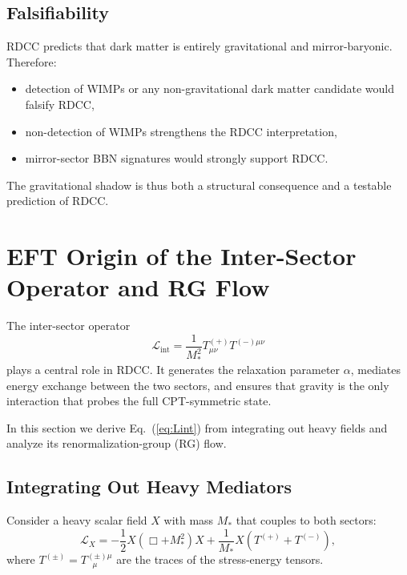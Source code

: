 \documentclass[11pt,a4paper]{article}
\begin{document}
\subsection{Falsifiability}

RDCC predicts that dark matter is entirely gravitational and mirror-baryonic. Therefore:

\begin{itemize}
\item detection of WIMPs or any non-gravitational dark matter candidate would falsify RDCC,
\item non-detection of WIMPs strengthens the RDCC interpretation,
\item mirror-sector BBN signatures would strongly support RDCC.
\end{itemize}

The gravitational shadow is thus both a structural consequence and a testable prediction of RDCC.
\section{EFT Origin of the Inter-Sector Operator and RG Flow}

The inter-sector operator
\begin{equation}
\mathcal{L}_{\mathrm{int}} = \frac{1}{M_*^2} T^{(+)}_{\mu\nu} T^{(-)\mu\nu}
\label{eq:Lint}
\end{equation}
plays a central role in RDCC. It generates the relaxation parameter $\alpha$, mediates energy exchange between the two sectors, and ensures that gravity is the only interaction that probes the full CPT-symmetric state.

In this section we derive Eq.~(\ref{eq:Lint}) from integrating out heavy fields and analyze its renormalization-group (RG) flow.

\subsection{Integrating Out Heavy Mediators}

Consider a heavy scalar field $X$ with mass $M_*$ that couples to both sectors:
\begin{equation}
\mathcal{L}_X = -\frac{1}{2} X(\Box + M_*^2)X 
+ \frac{1}{M_*} X \left( T^{(+)} + T^{(-)} \right),
\end{equation}
where $T^{(\pm)} = T^{(\pm)\mu}_{\ \ \ \mu}$ are the traces of the stress-energy tensors.
\end{document}
